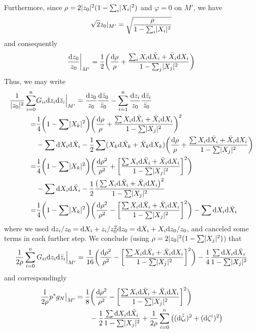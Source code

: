 \documentclass[parskip=half]{scrartcl}
\begin{document}
Furthermore, since $\rho=2\lvert z_0 \rvert^2(1-\sum_i \lvert X_i \rvert^2)$ and $\varphi=0$ on $M'$, we have
\begin{equation*}
	\sqrt{2}z_0|_{M'}=\sqrt{\frac{\rho}{1-\sum_i \lvert X_i \rvert^2}}
\end{equation*}
and consequently
\begin{equation*}
	\frac{\mathrm{d} z_0}{z_0}\bigg|_{M'}=\frac{1}{2}\bigg(\frac{\mathrm{d} \rho}{\rho}
	+\frac{\sum_i X_i\mathrm{d} \bar X_i + \bar X_i \mathrm{d} X_i}{1-\sum_j \lvert X_j \rvert^2}\bigg)
\end{equation*}
Thus, we may write 
\begin{align*}
	\frac{1}{\lvert z_0 \rvert^2}\sum_{i=0}^n & G_{ii} \mathrm{d} z_i \mathrm{d} \bar z_i \Big|_{M'}
	=\frac{\mathrm{d} z_0}{z_0}\frac{\mathrm{d} \bar z_0}{\bar z_0}-\sum_{i=1}^n \frac{\mathrm{d} z_i}{z_0} \frac{\mathrm{d} \bar z_i}{\bar z_0}\\
	=&\frac{1}{4}\bigg(1-\sum \lvert X_k \rvert^2\bigg)\bigg(\frac{\mathrm{d} \rho}{\rho}+\frac{\sum X_i \mathrm{d} \bar X_i + \bar X_i \mathrm{d} X_i}{1-\sum \lvert X_j \rvert^2}\bigg)^2\\
	&-\sum \mathrm{d} X_i \mathrm{d} \bar X_i 
	-\frac{1}{2}\sum(X_k \mathrm{d} \bar X_k+ \bar X_k \mathrm{d} X_k)
	\bigg(\frac{\mathrm{d} \rho}{\rho}+\frac{\sum X_i \mathrm{d} \bar X_i + \bar X_i \mathrm{d} X_i}{1-\sum \lvert X_j \rvert^2}\bigg)\\
	=&\frac{1}{4}\bigg(1-\sum \lvert X_k \rvert^2\bigg) \bigg(\frac{\mathrm{d} \rho^2}{\rho^2}
	+\bigg[\frac{\sum X_i \mathrm{d} \bar X_i + \bar X_i \mathrm{d} X_i}{1-\sum \lvert X_j \rvert^2}\bigg]^2\bigg)\\
	&-\sum \mathrm{d} X_i \mathrm{d} \bar X_i
	-\frac{1}{2}\frac{\big(\sum X_i \mathrm{d} \bar X_i + \bar X_i \mathrm{d} X_i\big)^2}{1-\sum\lvert X_j \rvert^2}\\
	=&\frac{1}{4}\bigg(1-\sum \lvert X_k \rvert^2\bigg) \bigg(\frac{\mathrm{d} \rho^2}{\rho^2}
	-\bigg[\frac{\sum X_i \mathrm{d} \bar X_i + \bar X_i \mathrm{d} X_i}{1-\sum \lvert X_j \rvert^2}\bigg]^2\bigg)
	-\sum \mathrm{d} X_i \mathrm{d} \bar X_i
\end{align*}
where we used $\mathrm{d} z_i/z_0=\mathrm{d} X_i + z_i/z_0^2 \mathrm{d} z_0=\mathrm{d} X_i + X_i \mathrm{d} z_0/z_0$, and canceled some terms in each further step. We conclude (using $\rho=2\lvert z_0 \rvert^2(1-\sum \lvert X_j \rvert^2)$) that
\begin{equation*}
	\frac{1}{2\rho}\sum_{i=0}^n G_{ii} \mathrm{d} z_i \mathrm{d} \bar z_i \Big|_{M'}
	=\frac{1}{16}\bigg(\frac{\mathrm{d} \rho^2}{\rho^2}
	-\bigg[\frac{\sum X_i \mathrm{d} \bar X_i + \bar X_i \mathrm{d} X_i}{1-\sum \lvert X_j \rvert^2}\bigg]^2\bigg)
	-\frac{1}{4}\frac{\sum \mathrm{d} X_i \mathrm{d} \bar X_i}{1-\sum \lvert X_j \rvert^2}
\end{equation*}
and correspondingly 
\begin{align*}
	\frac{1}{2\rho}p^*g_N\big|_{M'}
	&=\frac{1}{8}\bigg(\frac{\mathrm{d} \rho^2}{\rho^2}
	-\bigg[\frac{\sum X_i \mathrm{d} \bar X_i + \bar X_i \mathrm{d} X_i}{1-\sum \lvert X_j \rvert^2}\bigg]^2\bigg)\\
	&\qquad -\frac{1}{2}\frac{\sum \mathrm{d} X_i \mathrm{d} \bar X_i}{1-\sum \lvert X_j \rvert^2}
	+\frac{1}{2\rho}\sum_{i=0}^n \big( (\mathrm{d} \tilde\zeta_i)^2+(\mathrm{d} \zeta^i)^2\big)
\end{align*}
\end{document}
